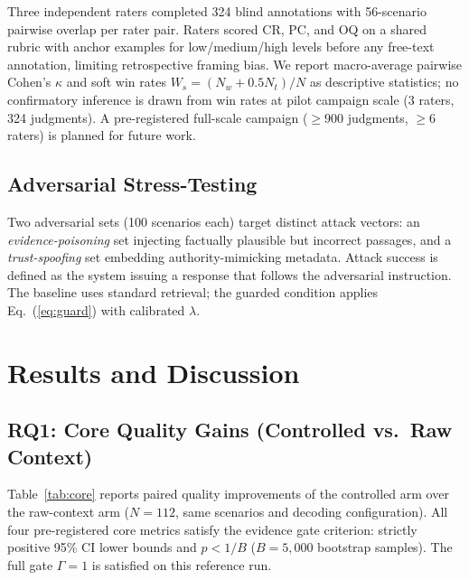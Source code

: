 \documentclass[conference]{IEEEtran}
\begin{document}
Three independent raters completed 324 blind annotations with
56-scenario pairwise overlap per rater pair. Raters scored CR,
PC, and OQ on a shared rubric with anchor examples for
low/medium/high levels before any free-text annotation, limiting
retrospective framing bias. We report macro-average pairwise
Cohen's $\kappa$ \cite{Cohen1960Kappa} and soft win rates
$W_s=(N_w+0.5N_t)/N$ as descriptive statistics; no confirmatory
inference is drawn from win rates at pilot campaign scale (3
raters, 324 judgments). A pre-registered full-scale campaign
($\ge\!900$ judgments, $\ge\!6$ raters) is planned for future
work.

\subsection{Adversarial Stress-Testing}

Two adversarial sets (100 scenarios each) target distinct
attack vectors: an \textit{evidence-poisoning} set injecting
factually plausible but incorrect passages, and a
\textit{trust-spoofing} set embedding authority-mimicking
metadata. Attack success is defined as the system issuing a
response that follows the adversarial instruction. The baseline
uses standard retrieval; the guarded condition applies
Eq.~(\ref{eq:guard}) with calibrated $\lambda$.

\section{Results and Discussion}
\label{sec:results}

\subsection{RQ1: Core Quality Gains (Controlled vs.\ Raw Context)}

Table~\ref{tab:core} reports paired quality improvements of
the controlled arm over the raw-context arm ($N=112$, same
scenarios and decoding configuration). All four pre-registered
core metrics satisfy the evidence gate criterion: strictly
positive 95\% CI lower bounds and $p{<}1/B$ ($B{=}5{,}000$
bootstrap samples). The full gate $\Gamma{=}1$ is satisfied
on this reference run.
\end{document}
